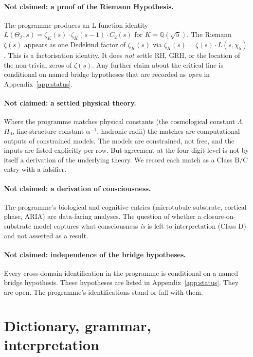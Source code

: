 \documentclass[11pt,a4paper]{article}
\newcommand{\II}{\mathcal{I}}
\newcommand{\Q}{\mathbb{Q}}
\begin{document}
\paragraph{Not claimed: a proof of the Riemann Hypothesis.}
The programme produces an L-function identity
$L(\Theta_\II, s) = \zeta_K(s) \cdot \zeta_K(s-1) \cdot C_2(s)$ for
$K = \Q(\sqrt 5)$. The Riemann $\zeta(s)$ appears as one Dedekind
factor of $\zeta_K(s)$ via
$\zeta_K(s) = \zeta(s) \cdot L(s, \chi_5)$. This is a factorisation
identity. It does \emph{not} settle RH, GRH, or the location of the
non-trivial zeros of $\zeta(s)$. Any further claim about the
critical line is conditional on named bridge hypotheses that are
recorded as \emph{open} in Appendix~\ref{app:status}.

\paragraph{Not claimed: a settled physical theory.}
Where the programme matches physical constants (the cosmological
constant $\Lambda$, $H_0$, fine-structure constant $\alpha^{-1}$,
hadronic radii) the matches are computational outputs of constrained
models. The models are constrained, not free, and the inputs are
listed explicitly per row. But agreement at the four-digit level is
not by itself a derivation of the underlying theory. We record each
match as a Class B/C entry with a falsifier.

\paragraph{Not claimed: a derivation of consciousness.}
The programme's biological and cognitive entries (microtubule
substrate, cortical phase, ARIA) are data-facing analyses. The
question of whether a closure-on-substrate model captures what
consciousness \emph{is} is left to interpretation (Class D) and not
asserted as a result.

\paragraph{Not claimed: independence of the bridge hypotheses.}
Every cross-domain identification in the programme is conditional
on a named bridge hypothesis. These hypotheses are listed in
Appendix~\ref{app:status}. They are open. The programme's
identifications stand or fall with them.

\section{Dictionary, grammar, interpretation}
\label{sec:grammar}
\end{document}
